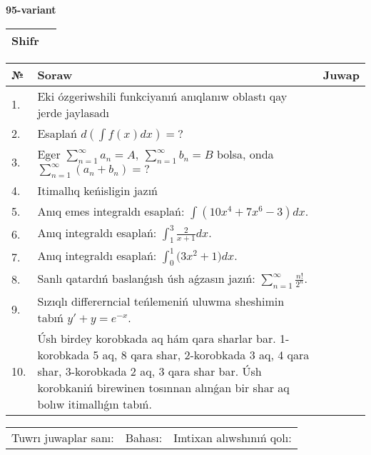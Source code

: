 \documentclass{article}
\begin{document}
  \egroup
  
  \newpage
  
  
  \textbf{95-variant}\\
  
  \bgroup
  \def\arraystretch{1.6} %
  
  \begin{tabular}{|m{5.7cm}|m{9.5cm}|}
  \hline
  Shifr & \\
  \hline
  \end{tabular}
  
  \vspace{1cm}
  
  \begin{tabular}{|m{0.7cm}|m{10cm}|m{4cm}|}
  \hline
  № & Soraw & Juwap \\
  \hline
  1. & Eki ózgeriwshili funkciyanıń anıqlanıw oblastı qay jerde jaylasadı &  \\
  \hline
  2. & Esaplań \(d\left( \int{f(x)dx} \right) = ?\) &  \\
  \hline
  3. & Eger \(\sum_{n = 1}^{\infty}a_{n} = A,\ \sum_{n = 1}^{\infty}b_{n} = B\) bolsa, onda \(\sum_{n = 1}^{\infty}\left( a_{n} + b_{n} \right) = ?\) &  \\
  \hline
  4. & Itimallıq keńisligin jazıń &  \\
  \hline
  5. & Anıq emes integraldı esaplań: \(\int{\left( 10x^{4} + 7x^{6} - 3 \right)dx}\). &  \\
  \hline
  6. & Anıq integraldı esaplań: \(\int_{1}^{3}\frac{2}{x + 1}dx\). &  \\
  \hline
  7. & Anıq integraldı esaplań: \(\int_{0}^{1}{(3x^2 } + 1)dx\). &  \\
  \hline
  8. & Sanlı qatardıń baslanǵısh úsh aǵzasın jazıń: \(\sum_{n = 1}^{\infty}\frac{n!}{2^{n}}\). &  \\
  \hline
  9. & Sızıqlı differerncial teńlemeniń uluwma sheshimin tabıń \(y' + y = e^{- x}\). &  \\
  \hline
  10. & Úsh birdey korobkada aq hám qara sharlar bar. 1-korobkada 5 aq, 8 qara shar, 2-korobkada 3 aq, 4 qara shar, 3-korobkada 2 aq, 3 qara shar bar. Úsh korobkaniń birewinen tosınnan alınǵan bir shar aq bolıw itimallıǵın tabıń. &  \\
  \hline
  \end{tabular}
  
  \vspace{1cm}
  
  \begin{tabular}{lll}
  Tuwrı juwaplar sanı: \underline{\hspace{1.5cm}} & 
  Bahası: \underline{\hspace{1.5cm}} & 
  Imtixan alıwshınıń qolı: \underline{\hspace{2cm}} \\
  \end{tabular}
  
\end{document}
